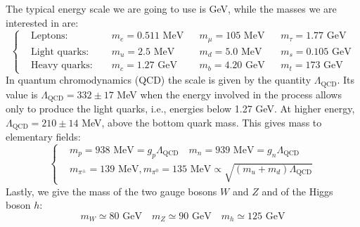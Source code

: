 \documentclass[../main.tex]{subfiles}
\begin{document}
The typical energy scale we are going to use is GeV, while the masses we are interested in are:
\[
\left\{
\begin{aligned}
&\text{Leptons: } &&m_e=0.511\text{ MeV} &&m_\mu=105\text{ MeV}  &&m_\tau=1.77\text{ GeV}\\
&\text{Light quarks: } &&m_u=2.5\text{ MeV}  &&m_d=5.0\text{ MeV}  &&m_s=0.105\text{ GeV}\\
&\text{Heavy quarks: } &&m_c=1.27\text{ GeV}  &&m_b=4.20\text{ GeV}  &&m_t=173\text{ GeV}
\end{aligned}
\right.
\]
In quantum chromodynamics (QCD) the scale is given by the quantity $\Lambda_{\text{QCD}}$. Its value is $\Lambda_{\text{QCD}}=332\pm17$ MeV when the energy involved in the process allows only to produce the light quarks, i.e., energies below 1.27 GeV. At higher energy, $\Lambda_{\text{QCD}}=210\pm14$ MeV, above the bottom quark mass. This gives mass to elementary fields:
\[
\left\{
\begin{aligned}
&m_p=938\text{ MeV}=g_p\Lambda_{\text{QCD}} \quad m_n=939\text{ MeV}=g_n\Lambda_{\text{QCD}}\\
&m_{\pi^\pm}=139\text{ MeV}, m_{\pi^0}=135\text{ MeV}\propto\sqrt{(m_u+m_d)\Lambda_{\text{QCD}}}
\end{aligned}
\right.
\]
Lastly, we give the mass of the two gauge bosons $W$ and $Z$ and of the Higgs boson $h$:
\[
m_W\simeq80\text{ GeV} \quad m_Z\simeq90\text{ GeV} \quad m_h\simeq125\text{ GeV}
\]
\end{document}
